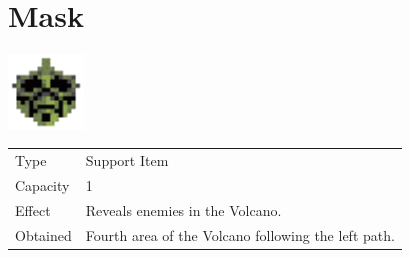 \section{Mask}
\label{item:mask}

\includegraphics[height=2cm,keepaspectratio]{./resources/items/mask}

\begin{longtable}{ l p{9cm} }
	Type
	& Support Item
\\ %
	Capacity
	& 1
\\ %
	Effect
	& Reveals enemies in the Volcano.
\\ %
	Obtained
	& Fourth area of the Volcano following the left path.
\end{longtable}
